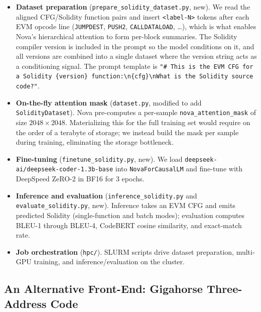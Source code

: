 \documentclass{article}
\begin{document}
\begin{itemize}
  \item \textbf{Dataset preparation} (\texttt{prepare\_solidity\_dataset.py}, new).
        We read the aligned CFG/Solidity function pairs and insert
        \texttt{<label-N>} tokens after each EVM opcode line (\texttt{JUMPDEST},
        \texttt{PUSH2}, \texttt{CALLDATALOAD}, \dots), which is what enables Nova's
        hierarchical attention to form per-block summaries. The Solidity compiler
        version is included in the prompt so the model conditions on it, and all
        versions are combined into a single dataset where the version string acts
        as a conditioning signal. The prompt template is
        \texttt{"\# This is the EVM CFG for a Solidity \{version\} function:\textbackslash n\{cfg\}\textbackslash nWhat is the Solidity source code?"}.
  \item \textbf{On-the-fly attention mask} (\texttt{dataset.py}, modified to add
        \texttt{SolidityDataset}). Nova pre-computes a per-sample
        \texttt{nova\_attention\_mask} of size $2048\times2048$. Materializing this
        for the full training set would require on the order of a terabyte of
        storage; we instead build the mask per sample during training, eliminating
        the storage bottleneck.
  \item \textbf{Fine-tuning} (\texttt{finetune\_solidity.py}, new). We load
        \texttt{deepseek-ai/deepseek-coder-1.3b-base} into
        \texttt{NovaForCausalLM} and fine-tune with DeepSpeed ZeRO-2 in BF16 for
        $3$ epochs.
  \item \textbf{Inference and evaluation} (\texttt{inference\_solidity.py} and
        \texttt{evaluate\_solidity.py}, new). Inference takes an EVM CFG and emits
        predicted Solidity (single-function and batch modes); evaluation computes
        BLEU-1 through BLEU-4, CodeBERT cosine similarity, and exact-match rate.
  \item \textbf{Job orchestration} (\texttt{hpc/}). SLURM scripts drive dataset
        preparation, multi-GPU training, and inference/evaluation on the cluster.
\end{itemize}

\subsection{An Alternative Front-End: Gigahorse Three-Address Code}
\label{sec:gigahorse}
\end{document}

